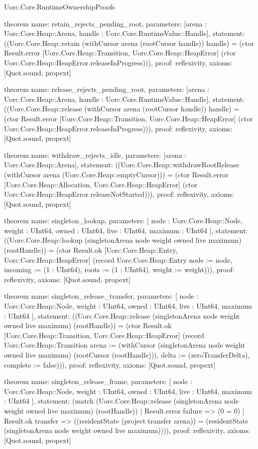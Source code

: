 \begin{lexlean}{Uorc.Core.RuntimeOwnershipProofs}
\begin{semanticmodule}
theorem{
  name: retain_rejects_pending_root,
  parameters: [arena : Uorc.Core.Heap::Arena, handle : Uorc.Core.RuntimeValue::Handle],
  statement: ((Uorc.Core.Heap::retain (withCursor arena (rootCursor handle)) handle) = (ctor Result.error [Uorc.Core.Heap::Transition, Uorc.Core.Heap::HeapError] (ctor Uorc.Core.Heap::HeapError.releaseInProgress))),
  proof: reflexivity{},
  axioms: [Quot.sound, propext]
}

theorem{
  name: release_rejects_pending_root,
  parameters: [arena : Uorc.Core.Heap::Arena, handle : Uorc.Core.RuntimeValue::Handle],
  statement: ((Uorc.Core.Heap::release (withCursor arena (rootCursor handle)) handle) = (ctor Result.error [Uorc.Core.Heap::Transition, Uorc.Core.Heap::HeapError] (ctor Uorc.Core.Heap::HeapError.releaseInProgress))),
  proof: reflexivity{},
  axioms: [Quot.sound, propext]
}

theorem{
  name: withdraw_rejects_idle,
  parameters: [arena : Uorc.Core.Heap::Arena],
  statement: ((Uorc.Core.Heap::withdrawRootRelease (withCursor arena (Uorc.Core.Heap::emptyCursor))) = (ctor Result.error [Uorc.Core.Heap::Allocation, Uorc.Core.Heap::HeapError] (ctor Uorc.Core.Heap::HeapError.releaseNotStarted))),
  proof: reflexivity{},
  axioms: [Quot.sound, propext]
}

theorem{
  name: singleton_lookup,
  parameters: [
    node : Uorc.Core.Heap::Node,
    weight : UInt64,
    owned : UInt64,
    live : UInt64,
    maximum : UInt64
  ],
  statement: ((Uorc.Core.Heap::lookup (singletonArena node weight owned live maximum) (rootHandle)) = (ctor Result.ok [Uorc.Core.Heap::Entry, Uorc.Core.Heap::HeapError] (record Uorc.Core.Heap::Entry {node := node, incoming := (1 : UInt64), roots := (1 : UInt64), weight := weight}))),
  proof: reflexivity{},
  axioms: [Quot.sound, propext]
}

theorem{
  name: singleton_release_transfer,
  parameters: [
    node : Uorc.Core.Heap::Node,
    weight : UInt64,
    owned : UInt64,
    live : UInt64,
    maximum : UInt64
  ],
  statement: ((Uorc.Core.Heap::release (singletonArena node weight owned live maximum) (rootHandle)) = (ctor Result.ok [Uorc.Core.Heap::Transition, Uorc.Core.Heap::HeapError] (record Uorc.Core.Heap::Transition {arena := (withCursor (singletonArena node weight owned live maximum) (rootCursor (rootHandle))), delta := (zeroTransferDelta), complete := false}))),
  proof: reflexivity{},
  axioms: [Quot.sound, propext]
}

theorem{
  name: singleton_release_frame,
  parameters: [
    node : Uorc.Core.Heap::Node,
    weight : UInt64,
    owned : UInt64,
    live : UInt64,
    maximum : UInt64
  ],
  statement: (match (Uorc.Core.Heap::release (singletonArena node weight owned live maximum) (rootHandle))
    | Result.error failure => (0 = 0)
    | Result.ok transfer => ((residentState (project transfer arena)) = (residentState (singletonArena node weight owned live maximum)))),
  proof: reflexivity{},
  axioms: [Quot.sound, propext]
}


\end{semanticmodule}
\end{lexlean}
